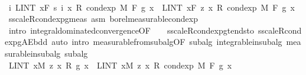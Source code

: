 \begin{isabellebody}
\ \ \ \ \ \ \isamarkupfalse%
\ \isamarkupfalse%
\ {\isachardoublequoteopen}{\isacharparenleft}{\kern0pt}{\isasymlambda}i{\isachardot}{\kern0pt}\ LINT\ x{\isacharbar}{\kern0pt}{\isacharquery}{\kern0pt}F{\isachardot}{\kern0pt}\ s\ i\ x\ {\isacharasterisk}{\kern0pt}\isactrlsub R\ cond{\isacharunderscore}{\kern0pt}exp\ M\ F\ g\ x{\isacharparenright}{\kern0pt}\ {\isasymlonglonglongrightarrow}\ LINT\ x{\isacharbar}{\kern0pt}{\isacharquery}{\kern0pt}F{\isachardot}{\kern0pt}\ z\ x\ {\isacharasterisk}{\kern0pt}\isactrlsub R\ cond{\isacharunderscore}{\kern0pt}exp\ M\ F\ g\ x{\isachardoublequoteclose}\ \isamarkupfalse%
\ s{\isacharunderscore}{\kern0pt}scaleR{\isacharunderscore}{\kern0pt}cond{\isacharunderscore}{\kern0pt}exp{\isacharunderscore}{\kern0pt}g{\isacharunderscore}{\kern0pt}meas\ asm{\isacharparenleft}{\kern0pt}{}{\isacharparenright}{\kern0pt}\ borel{\isacharunderscore}{\kern0pt}measurable{\isacharunderscore}{\kern0pt}cond{\isacharunderscore}{\kern0pt}exp{\isacharprime}{\kern0pt}\ \isamarkupfalse%
\ {\isacharparenleft}{\kern0pt}intro\ integral{\isacharunderscore}{\kern0pt}dominated{\isacharunderscore}{\kern0pt}convergence{\isacharbrackleft}{\kern0pt}OF\ {\isacharunderscore}{\kern0pt}\ {\isacharunderscore}{\kern0pt}\ {\isacharunderscore}{\kern0pt}\ s{\isacharunderscore}{\kern0pt}scaleR{\isacharunderscore}{\kern0pt}cond{\isacharunderscore}{\kern0pt}exp{\isacharunderscore}{\kern0pt}g{\isacharunderscore}{\kern0pt}tendsto\ s{\isacharunderscore}{\kern0pt}scaleR{\isacharunderscore}{\kern0pt}cond{\isacharunderscore}{\kern0pt}exp{\isacharunderscore}{\kern0pt}g{\isacharunderscore}{\kern0pt}AE{\isacharunderscore}{\kern0pt}bdd{\isacharbrackright}{\kern0pt}{\isacharparenright}{\kern0pt}\ {\isacharparenleft}{\kern0pt}auto\ intro{\isacharcolon}{\kern0pt}\ measurable{\isacharunderscore}{\kern0pt}from{\isacharunderscore}{\kern0pt}subalg{\isacharbrackleft}{\kern0pt}OF\ subalg{\isacharbrackright}{\kern0pt}\ integrable{\isacharunderscore}{\kern0pt}in{\isacharunderscore}{\kern0pt}subalg\ measurable{\isacharunderscore}{\kern0pt}in{\isacharunderscore}{\kern0pt}subalg\ subalg{\isacharparenright}{\kern0pt}\isanewline
\ \ \ \ \ \ \isamarkupfalse%
\ \isamarkupfalse%
\ {\isachardoublequoteopen}LINT\ x{\isacharbar}{\kern0pt}M{\isachardot}{\kern0pt}\ z\ x\ {\isacharasterisk}{\kern0pt}\isactrlsub R\ g\ x\ {\isacharequal}{\kern0pt}\ LINT\ x{\isacharbar}{\kern0pt}M{\isachardot}{\kern0pt}\ z\ x\ {\isacharasterisk}{\kern0pt}\isactrlsub R\ cond{\isacharunderscore}{\kern0pt}exp\ M\ F\ g\ x{\isachardoublequoteclose}\ \isamarkupfalse%

\end{isabellebody}

